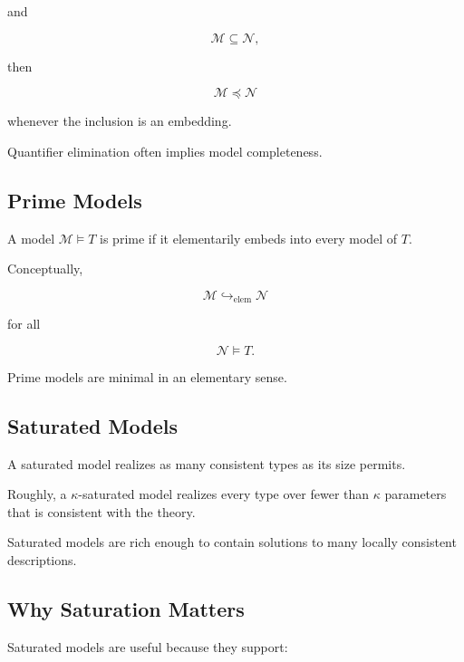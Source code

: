 and

\[
\mathcal{M}
\subseteq
\mathcal{N},
\]

then

\[
\boxed{
\mathcal{M}
\preccurlyeq
\mathcal{N}
}
\]

whenever the inclusion is an embedding.

Quantifier elimination often implies model completeness.

\subsection{Prime Models}
\label{subsec:prime-models}

A model \(\mathcal{M}\models T\) is prime if it elementarily embeds into
every model of \(T\).

Conceptually,

\[
\boxed{
\mathcal{M}
\hookrightarrow_{\mathrm{elem}}
\mathcal{N}
}
\]

for all

\[
\mathcal{N}\models T.
\]

Prime models are minimal in an elementary sense.

\subsection{Saturated Models}
\label{subsec:saturated-models}

A saturated model realizes as many consistent types as its size permits.

Roughly, a \(\kappa\)-saturated model realizes every type over fewer than
\(\kappa\) parameters that is consistent with the theory.

Saturated models are rich enough to contain solutions to many locally
consistent descriptions.

\subsection{Why Saturation Matters}
\label{subsec:why-saturation-matters}

Saturated models are useful because they support:

